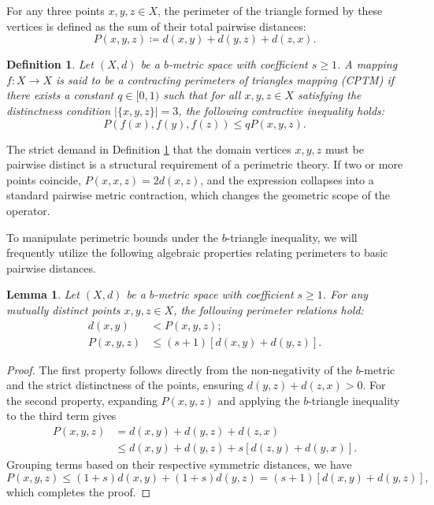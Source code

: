 \documentclass[a4paper,12pt,oneside]{article}
\newtheorem{definition}[theorem]{Definition}
\newtheorem{lemma}[theorem]{Lemma}
\numberwithin{equation}{section}
\begin{document}
For any three points $x,y,z\in X$, the perimeter of the triangle formed by these vertices is defined as the sum of their total pairwise distances:
\begin{equation}
P(x,y,z)\coloneqq d(x,y) + d(y,z) + d(z,x).
\label{eq:perimeter_def}
\end{equation}

\begin{definition}
\label{def:mcpT}
Let $(X,d)$ be a $b$-metric space with coefficient $s\geq 1$. A mapping $f:X\to X$ is said to be a \emph{ contracting perimeters of triangles mapping} (CPTM) if there exists a constant $q\in [0,1)$ such that for all $x,y,z\in X$ satisfying the distinctness condition $|\{x,y,z\}| = 3$, the following contractive inequality holds:
\begin{equation}
P(f(x),f(y),f(z))\leq qP(x,y,z). \label{eq:mcpT}
\end{equation}
\end{definition}

The strict demand in Definition \ref{def:mcpT} that the domain vertices $x,y,z$ must be pairwise distinct is a structural requirement of a perimetric theory. If two or more points coincide, $P(x,x,z) = 2d(x,z)$, and the expression collapses into a standard pairwise metric contraction, which changes the geometric scope of the operator.

To manipulate perimetric bounds under the $b$-triangle inequality, we will frequently utilize the following algebraic properties relating perimeters to basic pairwise distances.

\begin{lemma}
\label{lem:perimeter_relations}
Let $(X,d)$ be a $b$-metric space with coefficient $s\geq 1$. For any mutually distinct points $x,y,z\in X$, the following perimeter relations hold:
\begin{align}
d(x,y) &< P(x,y,z); \label{eq:perim_lb}\\
P(x,y,z) &\leq (s + 1)[d(x,y) + d(y,z)]. \label{eq:perim_ub}
\end{align}
\end{lemma}

\begin{proof}
The first property follows directly from the non-negativity of the $b$-metric and the strict distinctness of the points, ensuring $d(y,z) + d(z,x) > 0$. For the second property, expanding $P(x,y,z)$ and applying the $b$-triangle inequality to the third term gives
\begin{align*}
P(x,y,z) &= d(x,y) + d(y,z) + d(z,x)\\
&\leq d(x,y) + d(y,z) + s[d(z,y) + d(y,x)].
\end{align*}
Grouping terms based on their respective symmetric distances, we have
\[
P(x,y,z)\leq (1 + s)d(x,y) + (1 + s)d(y,z) = (s + 1)[d(x,y) + d(y,z)],
\]
which completes the proof.
\end{proof}
\end{document}
